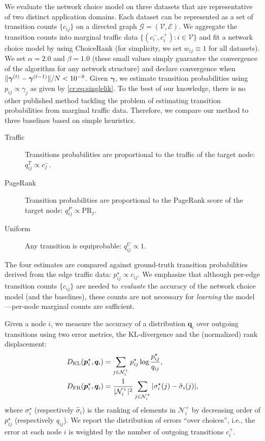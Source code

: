 We evaluate the network choice model on three datasets that are representative of two distinct application domains.
Each dataset can be represented as a set of transition counts $\{ c_{ij} \}$ on a directed graph $\mathcal{G} = (\mathcal{V}, \mathcal{E})$.
We aggregate the transition counts into marginal traffic data $\{ (c^-_i, c^+_i) : i \in \mathcal{V} \}$ and fit a network choice model by using ChoiceRank (for simplicity, we set $w_{ij} \equiv 1$ for all datasets).
We set $\alpha = 2.0$ and $\beta = 1.0$ (these small values simply guarantee the convergence of the algorithm for any network structure) and declare convergence when $\lVert\bm{\gamma}^{(t)} - \bm{\gamma}^{(t-1)}\rVert / N < 10^{-8}$.
Given $\bm{\gamma}$, we estimate transition probabilities using $p_{ij} \propto \gamma_j$ as given by \eqref{cr:eq:singlelik}.
To the best of our knowledge, there is no other published method tackling the problem of estimating transition probabilities from marginal traffic data.
Therefore, we compare our method to three baselines based on simple heuristics.
\begin{description}
\item[Traffic] Transitions probabilities are proportional to the traffic of the target node: $q_{ij}^T \propto c_j^{-}$.
\item[PageRank] Transition probabilities are proportional to the PageRank score of the target node: $q_{ij}^P \propto \text{PR}_j$.
\item[Uniform] Any transition is equiprobable: $q_{ij}^U \propto 1$.
\end{description}
The four estimates are compared against ground-truth transition probabilities derived from the edge traffic data: $p_{ij}^\star \propto c_{ij}$.
We emphasize that although per-edge transition counts $\{c_{ij}\}$ are needed to \emph{evaluate} the accuracy of the network choice model (and the baselines), these counts are not necessary for \emph{learning} the model---per-node marginal counts are sufficient.

Given a node $i$, we measure the accuracy of a distribution $\bm{q}_i$ over outgoing transitions using two error metrics, the KL-divergence and the (normalized) rank displacement:
\begin{align*}
D_{\text{KL}}(\bm{p}_i^\star, \bm{q}_i) &= \sum_{j \in \mathcal{N}^+_i} p^\star_{ij} \log \frac{p^\star_{ij}}{q_{ij}}, \\
D_{\text{FR}}(\bm{p}_i^\star, \bm{q}_i) &= \frac{1}{\lvert\mathcal{N}^+_i\rvert^2} \sum_{j \in \mathcal{N}^+_i} \vert \sigma^\star_i(j) - \hat{\sigma}_i(j) \vert,
\end{align*}
where $\sigma^\star_i$ (respectively $\hat{\sigma}_i$) is the ranking of elements in $\mathcal{N}^+_i$ by decreasing order of $p^\star_{ij}$ (respectively $q_{ij}$).
We report the distribution of errors ``over choices'', i.e., the error at each node $i$ is weighted by the number of outgoing transitions $c^+_i$.


